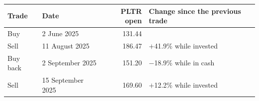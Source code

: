 \begin{tabular}{llrl}
\toprule
Trade & Date & PLTR open & Change since the previous trade \\
\midrule
Buy & 2 June 2025 & 131.44 &  \\
Sell & 11 August 2025 & 186.47 & $+$41.9\% while invested \\
Buy back & 2 September 2025 & 151.20 & $-$18.9\% while in cash \\
Sell & 15 September 2025 & 169.60 & $+$12.2\% while invested \\
\bottomrule
\end{tabular}
